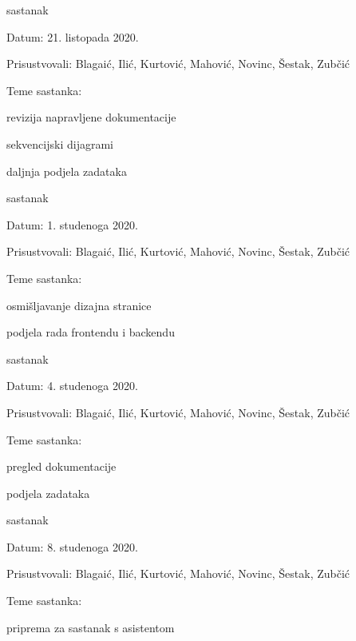 \begin{packed_enum}
			\item  sastanak
			\item[] \begin{packed_item}
				\item Datum: 21. listopada 2020.
				\item Prisustvovali: Blagaić, Ilić, Kurtović, Mahović, Novinc, Šestak, Zubčić
				\item Teme sastanka:
				\begin{packed_item}
					\item  revizija napravljene dokumentacije
					\item  sekvencijski dijagrami
					\item  daljnja podjela zadataka 
				\end{packed_item}
			\end{packed_item}
		
			\item  sastanak
			\item[] \begin{packed_item}
				\item Datum: 1. studenoga 2020.
				\item Prisustvovali: Blagaić, Ilić, Kurtović, Mahović, Novinc, Šestak, Zubčić
				\item Teme sastanka:
				\begin{packed_item}
					\item  osmišljavanje dizajna stranice
					\item  podjela rada frontendu i backendu
				\end{packed_item}
			\end{packed_item}
		
			\item  sastanak
			\item[] \begin{packed_item}
				\item Datum: 4. studenoga 2020.
				\item Prisustvovali: Blagaić, Ilić, Kurtović, Mahović, Novinc, Šestak, Zubčić
				\item Teme sastanka:
				\begin{packed_item}
					\item  pregled dokumentacije
					\item  podjela zadataka
				\end{packed_item}
			\end{packed_item}
		
			\item  sastanak
			\item[] \begin{packed_item}
				\item Datum: 8. studenoga 2020.
				\item Prisustvovali: Blagaić, Ilić, Kurtović, Mahović, Novinc, Šestak, Zubčić
				\item Teme sastanka:
				\begin{packed_item}
					\item  priprema za sastanak s asistentom
				\end{packed_item}
			\end{packed_item}
		

\end{packed_enum}
